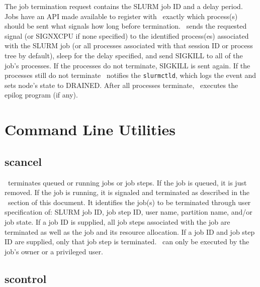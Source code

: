 The job termination request contains the SLURM job ID and a delay
period.  Jobs have an API made available to register with \slurmd\
exactly which process(s) should be sent what signals how long before
termination.  \slurmd\ sends the requested signal (or
SIGNXCPU if none specified) to the identified process(es) associated with
the SLURM job (or all processes associated with that session ID or process
tree by default), sleep for the delay specified, and send SIGKILL to all
of the job's processes.  If the processes do not terminate, SIGKILL is
sent again.  If the processes still do not terminate \slurmd\ notifies
the {\tt slurmctld}, which logs the event and sets node's state to DRAINED.
After all processes terminate, \slurmd\ executes the epilog program
(if any).

\section{Command Line Utilities}

\subsection{scancel}

\scancel\ terminates queued or running jobs or job steps.
If the job is queued, it is just removed.  If the job is
running, it is signaled and terminated as described in the \slurmd\
section of this document.  It identifies the job(s) to be terminated
through user specification of: SLURM job ID, job step ID, user name, 
partition name, and/or job state. 
If a job ID is supplied, all job steps associated with the job are
terminated as well as the job and its resource allocation. 
If a job ID and job step ID are supplied, only that job step is terminated.
\scancel\ can only be executed by the job's owner or a privileged user.

\subsection{scontrol}


